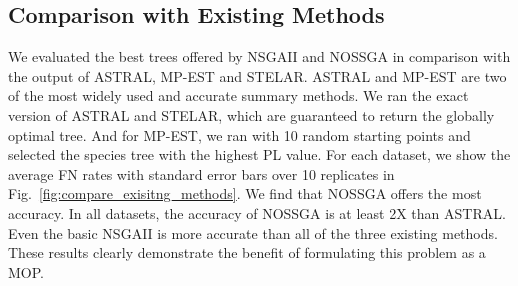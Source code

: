 \subsection{Comparison with Existing Methods}
We evaluated the best trees offered by NSGAII and NOSSGA in comparison with the output of ASTRAL, MP-EST and STELAR. ASTRAL and MP-EST are two of the most widely used and accurate
summary methods. 
We ran the exact version of ASTRAL and STELAR, which are guaranteed to return the globally optimal tree. And for MP-EST, we ran with 10 random starting points and selected the species tree with the
highest PL value. 
For each dataset, we show the average FN rates with standard error bars over 10 replicates in Fig.~\ref{fig:compare_exisitng_methods}. We find that NOSSGA offers the most accuracy. In all datasets, the accuracy of NOSSGA is at least 2X than ASTRAL. Even the basic NSGAII is more accurate than all of the three existing methods. These results clearly demonstrate the benefit of formulating this problem as a MOP. 



